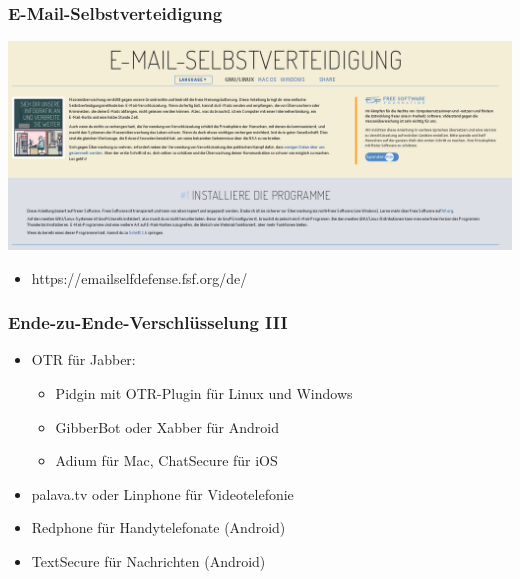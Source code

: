 \documentclass[12pt]{beamer}
\begin{document}
\begin{frame}
  \frametitle{E-Mail-Selbstverteidigung}
  \begin{center}
    \includegraphics[height=0.5\textheight]{img/emailselfdefense.png}
    \begin{itemize}
      \item https://emailselfdefense.fsf.org/de/
    \end{itemize}	
  \end{center}	
\end{frame}

\begin{frame}
  \frametitle{Ende-zu-Ende-Verschlüsselung III}
  \begin{itemize}
    \item<2-> OTR für Jabber:
      \begin{itemize}
        \item Pidgin mit OTR-Plugin für Linux und Windows
        \item GibberBot oder Xabber für Android
        \item Adium für Mac, ChatSecure für iOS
      \end{itemize}
    \item<3-> palava.tv oder Linphone für Videotelefonie
    \item<4-> Redphone für Handytelefonate (Android)
    \item<5-> TextSecure für Nachrichten (Android)
  \end{itemize}
\end{frame}
\end{document}
